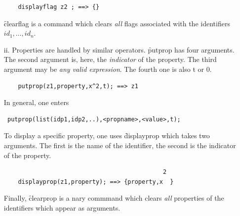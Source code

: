 \begin{itemize}
\begin{verbatim}
    displayflag z2 ; ==> {}
\end{verbatim}
\f{clearflag} is a command which clears \emph{all} flags associated with
the identifiers $id_1, \ldots , id_n .$
\item[ii.] Properties are handled by similar operators.
%
\hypertarget{operator:PUTPROP}{}%
\f{putprop} has four arguments. The second argument is, here, the
\emph{indicator} of the property. The third argument may be \emph{any
valid expression}. The fourth one is also t or 0.
\begin{verbatim}
    putprop(z1,property,x^2,t); ==> z1
\end{verbatim}
In general, one enters
\begin{verbatim}
 putprop(list(idp1,idp2,..),<propname>,<value>,t);
\end{verbatim}
\hypertarget{operator:DISPLAYPROP}{}
To display a specific property, one uses
\f{displayprop} which takes two arguments. The first is the name of the
identifier, the second is the indicator of the property.
\begin{verbatim}
                                             2
    displayprop(z1,property); ==> {property,x  }
\end{verbatim}
\hypertarget{operator:CLEARPROP}{}
Finally, \f{clearprop} is a nary commmand which clears \emph{all}
properties of the identifiers which appear as arguments.
\end{itemize}
